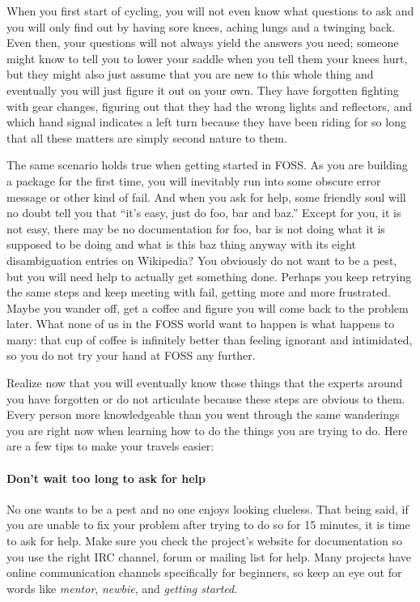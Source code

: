When you first start of cycling, you will not even know what questions to ask
and you will only find out by having sore knees, aching lungs and a twinging
back. Even then, your questions will not always yield the answers you need;
someone might know to tell you to lower your saddle when you tell them your
knees hurt, but they might also just assume that you are new to this whole thing
and eventually you will just figure it out on your own. They have forgotten
fighting with gear changes, figuring out that they had the wrong lights and
reflectors, and which hand signal indicates a left turn because they have been
riding for so long that all these matters are simply second nature to them.

The same scenario holds true when getting started in FOSS. As you are building a
package for the first time, you will inevitably run into some obscure error
message or other kind of fail. And when you ask for help, some friendly soul
will no doubt tell you that ``it’s easy, just do foo, bar and baz.'' Except for
you, it is not easy, there may be no documentation for foo, bar is not doing
what it is supposed to be doing and what is this baz thing anyway with its eight
disambiguation entries on Wikipedia? You obviously do not want to be a pest, but
you will need help to actually get something done. Perhaps you keep retrying the
same steps and keep meeting with fail, getting more and more frustrated. Maybe
you wander off, get a coffee and figure you will come back to the problem later.
What none of us in the FOSS world want to happen is what happens to many: that
cup of coffee is infinitely better than feeling ignorant and intimidated, so you
do not try your hand at FOSS any further.

Realize now that you will eventually know those things that the experts around
you have forgotten or do not articulate because these steps are obvious to them.
Every person more knowledgeable than you went through the same wanderings you
are right now when learning how to do the things you are trying to do. Here are
a few tips to make your travels easier:

\paragraph*{Don’t wait too long to ask for help} No one wants to be a pest and
no one enjoys looking clueless. That being said, if you are unable to fix your
problem after trying to do so for 15 minutes, it is time to ask for help. Make
sure you check the project’s website for documentation so you use the right IRC
channel, forum or mailing list for help. Many projects have online communication
channels specifically for beginners, so keep an eye out for words like
\textit{mentor}, \textit{newbie}, and \textit{getting started}.

